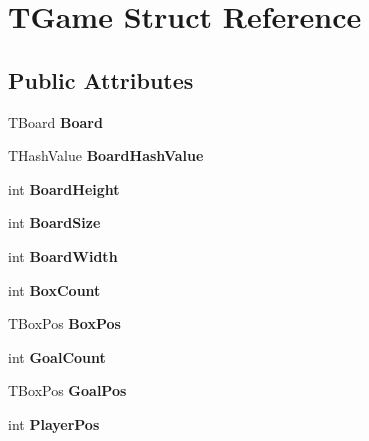 \hypertarget{struct_t_game}{}\section{T\+Game Struct Reference}
\label{struct_t_game}
\subsection*{Public Attributes}
\begin{DoxyCompactItemize}
\item 
\mbox{\label{struct_t_game_a1084b123e380eb809c69c820325865a9}} 
T\+Board {\bfseries Board}
\item 
\mbox{\label{struct_t_game_ae3140d21d23c05534d1f1989a20286a6}} 
T\+Hash\+Value {\bfseries Board\+Hash\+Value}
\item 
\mbox{\label{struct_t_game_a7a7914ca7914b8f6e1cb84a5ba806ad3}} 
int {\bfseries Board\+Height}
\item 
\mbox{\label{struct_t_game_af829dc4458221a288ea25f1a844f6460}} 
int {\bfseries Board\+Size}
\item 
\mbox{\label{struct_t_game_a74cadd3aafc04dad3dfcdbffebd78102}} 
int {\bfseries Board\+Width}
\item 
\mbox{\label{struct_t_game_af76b4df0d86fbc0b71389d9e2522a7fd}} 
int {\bfseries Box\+Count}
\item 
\mbox{\label{struct_t_game_abf0e3854304871812ff88cb3d60fb680}} 
T\+Box\+Pos {\bfseries Box\+Pos}
\item 
\mbox{\label{struct_t_game_a5f4af9afbc7caa90205f2575fd3e6c3a}} 
int {\bfseries Goal\+Count}
\item 
\mbox{\label{struct_t_game_a00e6394ac7f96681ed9c73b82d91753b}} 
T\+Box\+Pos {\bfseries Goal\+Pos}
\item 
\mbox{\label{struct_t_game_a890f798c58835facaadb26aaa800084b}} 
int {\bfseries Player\+Pos}
\item 

\end{DoxyCompactItemize}
